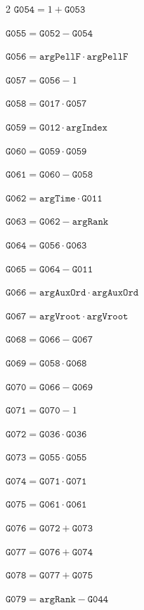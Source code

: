 \documentclass[10pt]{article}
\begin{document}
\begin{multicols}{2}
\noindent $\mathtt{G054}=1+\mathtt{G053}$\par
\noindent $\mathtt{G055}=\mathtt{G052}-\mathtt{G054}$\par
\noindent $\mathtt{G056}=\mathtt{argPellF}\cdot \mathtt{argPellF}$\par
\noindent $\mathtt{G057}=\mathtt{G056}-1$\par
\noindent $\mathtt{G058}=\mathtt{G017}\cdot \mathtt{G057}$\par
\noindent $\mathtt{G059}=\mathtt{G012}\cdot \mathtt{argIndex}$\par
\noindent $\mathtt{G060}=\mathtt{G059}\cdot \mathtt{G059}$\par
\noindent $\mathtt{G061}=\mathtt{G060}-\mathtt{G058}$\par
\noindent $\mathtt{G062}=\mathtt{argTime}\cdot \mathtt{G011}$\par
\noindent $\mathtt{G063}=\mathtt{G062}-\mathtt{argRank}$\par
\noindent $\mathtt{G064}=\mathtt{G056}\cdot \mathtt{G063}$\par
\noindent $\mathtt{G065}=\mathtt{G064}-\mathtt{G011}$\par
\noindent $\mathtt{G066}=\mathtt{argAuxOrd}\cdot \mathtt{argAuxOrd}$\par
\noindent $\mathtt{G067}=\mathtt{argVroot}\cdot \mathtt{argVroot}$\par
\noindent $\mathtt{G068}=\mathtt{G066}-\mathtt{G067}$\par
\noindent $\mathtt{G069}=\mathtt{G058}\cdot \mathtt{G068}$\par
\noindent $\mathtt{G070}=\mathtt{G066}-\mathtt{G069}$\par
\noindent $\mathtt{G071}=\mathtt{G070}-1$\par
\noindent $\mathtt{G072}=\mathtt{G036}\cdot \mathtt{G036}$\par
\noindent $\mathtt{G073}=\mathtt{G055}\cdot \mathtt{G055}$\par
\noindent $\mathtt{G074}=\mathtt{G071}\cdot \mathtt{G071}$\par
\noindent $\mathtt{G075}=\mathtt{G061}\cdot \mathtt{G061}$\par
\noindent $\mathtt{G076}=\mathtt{G072}+\mathtt{G073}$\par
\noindent $\mathtt{G077}=\mathtt{G076}+\mathtt{G074}$\par
\noindent $\mathtt{G078}=\mathtt{G077}+\mathtt{G075}$\par
\noindent $\mathtt{G079}=\mathtt{argRank}-\mathtt{G044}$\par

\end{multicols}
\end{document}
